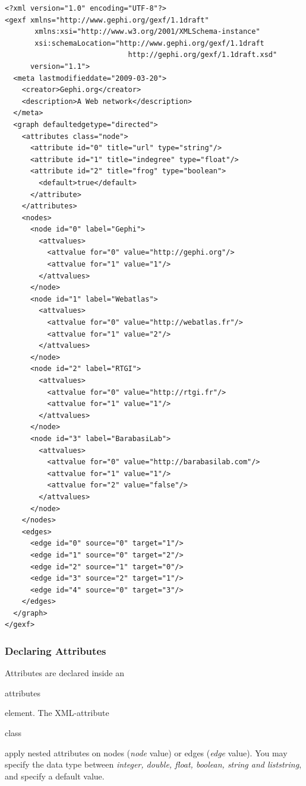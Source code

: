 \documentclass[a4paper,10pt]{article}
\begin{document}
\lstset{ style=gexf }
\begin{lstlisting}[caption={A (small) Web Graph},label=webgraph]
<?xml version="1.0" encoding="UTF-8"?>
<gexf xmlns="http://www.gephi.org/gexf/1.1draft"
       xmlns:xsi="http://www.w3.org/2001/XMLSchema-instance"
       xsi:schemaLocation="http://www.gephi.org/gexf/1.1draft
                             http://gephi.org/gexf/1.1draft.xsd"
      version="1.1">
  <meta lastmodifieddate="2009-03-20">
    <creator>Gephi.org</creator>
    <description>A Web network</description>
  </meta>
  <graph defaultedgetype="directed">
    <attributes class="node">
      <attribute id="0" title="url" type="string"/>
      <attribute id="1" title="indegree" type="float"/>
      <attribute id="2" title="frog" type="boolean">
        <default>true</default>
      </attribute>
    </attributes>
    <nodes>
      <node id="0" label="Gephi">
        <attvalues>
          <attvalue for="0" value="http://gephi.org"/>
          <attvalue for="1" value="1"/>
        </attvalues>
      </node>
      <node id="1" label="Webatlas">
        <attvalues>
          <attvalue for="0" value="http://webatlas.fr"/>
          <attvalue for="1" value="2"/>
        </attvalues>
      </node>
      <node id="2" label="RTGI">
        <attvalues>
          <attvalue for="0" value="http://rtgi.fr"/>
          <attvalue for="1" value="1"/>
        </attvalues>
      </node>
      <node id="3" label="BarabasiLab">
        <attvalues>
          <attvalue for="0" value="http://barabasilab.com"/>
          <attvalue for="1" value="1"/>
          <attvalue for="2" value="false"/>
        </attvalues>
      </node>
    </nodes>
    <edges>
      <edge id="0" source="0" target="1"/>
      <edge id="1" source="0" target="2"/>
      <edge id="2" source="1" target="0"/>
      <edge id="3" source="2" target="1"/>
      <edge id="4" source="0" target="3"/>
    </edges>
  </graph>
</gexf>
\end{lstlisting}


\subsubsection{Declaring Attributes}

Attributes are declared inside an \begin{footnotesize}attributes\end{footnotesize} element. The XML-attribute \begin{footnotesize}class\end{footnotesize} apply nested attributes on nodes (\textit{node} value) or edges (\textit{edge} value). You may specify the data type between \textit{integer, double, float, boolean, string and liststring}, and specify a default value.
\end{document}
